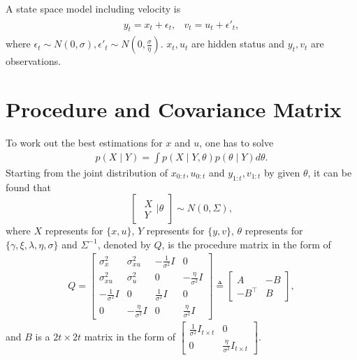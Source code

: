 A state space model including velocity is
\begin{align*}
\begin{matrix}
y_t=x_t+\epsilon_t, & v_t=u_t+\epsilon'_t,
\end{matrix}
\end{align*}
where $\epsilon_t\sim N(0,\sigma),\epsilon'_t\sim N(0,\frac{\sigma}{\eta})$. $x_t,u_t$ are hidden status and $y_t,v_t$ are observations. 

\section{Procedure and Covariance Matrix}
To work out the best estimations for $x$ and $u$, one has to solve
\begin{align}\label{objecfun}
p(X\mid Y) = \int p(X\mid Y,\theta)p(\theta\mid Y)d\theta.
\end{align} 
Starting from the joint distribution of $x_{0:t},u_{0:t}$ and $y_{1:t},v_{1:t}$ by given $\theta$, it can be found that
\begin{equation}\label{jointmatrix}
\begin{bmatrix} \begin{matrix}X\\Y  \end{matrix} \biggr\rvert \theta \end{bmatrix}
\sim N\left(0, \Sigma \right),
\end{equation}
where $X$ represents for $\{x,u\}$, $Y$ represents for $\{y,v\}$, $\theta$ represents for $\{\gamma,\xi,\lambda,\eta,\sigma\}$ and $\Sigma^{-1}$, denoted by $Q$, is the procedure matrix in the form of
\begin{align*} Q=
\begin{bmatrix}
\sigma_x^2 &\sigma_{xu}^2 & -\frac{1}{\sigma^2}I & 0\\
\sigma_{xu}^2 &\sigma_{u}^2 & 0 &-\frac{\eta}{\sigma^2}I \\
-\frac{1}{\sigma^2}I & 0 & \frac{1}{\sigma^2}I  & 0\\
 0  &  -\frac{\eta}{\sigma^2}I  & 0 & \frac{\eta}{\sigma^2}I 
\end{bmatrix} \triangleq \begin{bmatrix}
A & -B \\ -B^\top & B
\end{bmatrix},
\end{align*}
and $B$ is a $2t\times 2t$ matrix in the form of $\begin{bmatrix}
\frac{1}{\sigma^2} I_{t\times t} & 0 \\ 0 & \frac{\eta}{\sigma^2} I_{t\times t} 
\end{bmatrix}$. 
